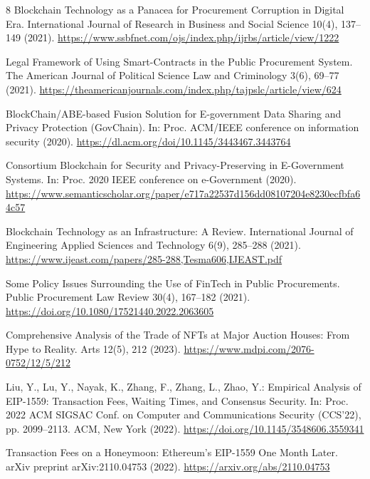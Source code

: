 \documentclass[runningheads]{llncs}
\begin{document}
\begin{thebibliography}{8}
Blockchain Technology as a Panacea for Procurement Corruption in Digital Era.
International Journal of Research in Business and Social Science 10(4), 137--149 (2021).
\url{https://www.ssbfnet.com/ojs/index.php/ijrbs/article/view/1222}

Legal Framework of Using Smart-Contracts in the Public Procurement System.
The American Journal of Political Science Law and Criminology 3(6), 69--77 (2021).
\url{https://theamericanjournals.com/index.php/tajpslc/article/view/624}

BlockChain/ABE-based Fusion Solution for E-government Data Sharing and Privacy Protection (GovChain).
In: Proc. ACM/IEEE conference on information security (2020).
\url{https://dl.acm.org/doi/10.1145/3443467.3443764}

Consortium Blockchain for Security and Privacy-Preserving in E-Government Systems.
In: Proc. 2020 IEEE conference on e-Government (2020).
\url{https://www.semanticscholar.org/paper/e717a22537d156dd08107204e8230ecfbfa64c57}

Blockchain Technology as an Infrastructure: A Review.
International Journal of Engineering Applied Sciences and Technology 6(9), 285--288 (2021).
\url{https://www.ijeast.com/papers/285-288,Tesma606,IJEAST.pdf}

Some Policy Issues Surrounding the Use of FinTech in Public Procurements.
Public Procurement Law Review 30(4), 167--182 (2021).
\url{https://doi.org/10.1080/17521440.2022.2063605}



Comprehensive Analysis of the Trade of NFTs at Major Auction Houses: From Hype to Reality.
Arts 12(5), 212 (2023).
\url{https://www.mdpi.com/2076-0752/12/5/212}


Liu, Y., Lu, Y., Nayak, K., Zhang, F., Zhang, L., Zhao, Y.:
Empirical Analysis of EIP-1559: Transaction Fees, Waiting Times, and Consensus Security.
In: Proc. 2022 ACM SIGSAC Conf. on Computer and Communications Security (CCS'22), pp. 2099--2113.
ACM, New York (2022).
\url{https://doi.org/10.1145/3548606.3559341}

Transaction Fees on a Honeymoon: Ethereum's EIP-1559 One Month Later.
arXiv preprint arXiv:2110.04753 (2022).
\url{https://arxiv.org/abs/2110.04753}


\end{thebibliography}
\end{document}
